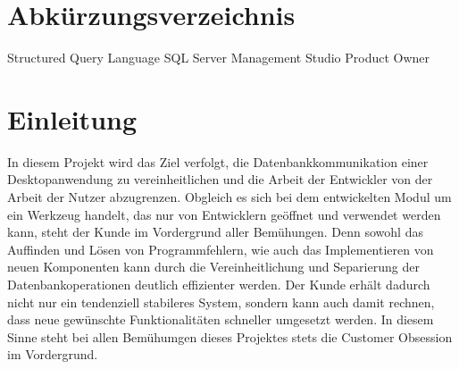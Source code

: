 \documentclass[11pt,toc=sectionentrywithoutdots, 
headheight=44pt, headings=optiontoheadandtoc, hyperfootnotes=false, hypertexnames=false]{scrartcl}
\begin{document}
\tableofcontents


\setcounter{secnumdepth}{0}

\newpage

{}
\listoffigures





{}
\listoftables


\section{Abkürzungsverzeichnis}


\begin{acronym}[xxxxxxx]

 {Structured Query Language}
 {SQL Server Management Studio}
 {Product Owner}

\end{acronym}

{}
\printglossary[nonumberlist]
\newpage


\setcounter{secnumdepth}{1}
\setcounter{secnumdepth}{4}

\section{Einleitung}
In diesem Projekt wird das Ziel verfolgt, die Datenbankkommunikation einer Desktopanwendung zu vereinheitlichen und die Arbeit der Entwickler von der Arbeit der Nutzer abzugrenzen. Obgleich es sich bei dem entwickelten Modul um ein Werkzeug handelt, das nur von Entwicklern geöffnet und verwendet werden kann, steht der Kunde im Vordergrund aller Bemühungen. Denn sowohl das Auffinden und Lösen von Programmfehlern, wie auch das Implementieren von neuen Komponenten kann durch die Vereinheitlichung und Separierung der Datenbankoperationen deutlich effizienter werden. Der Kunde erhält dadurch nicht nur ein tendenziell stabileres System, sondern kann auch damit rechnen, dass neue gewünschte Funktionalitäten schneller umgesetzt werden. In diesem Sinne steht bei allen Bemühumgen dieses Projektes stets die \gls{Customer Obsession} im Vordergrund.
\end{document}
